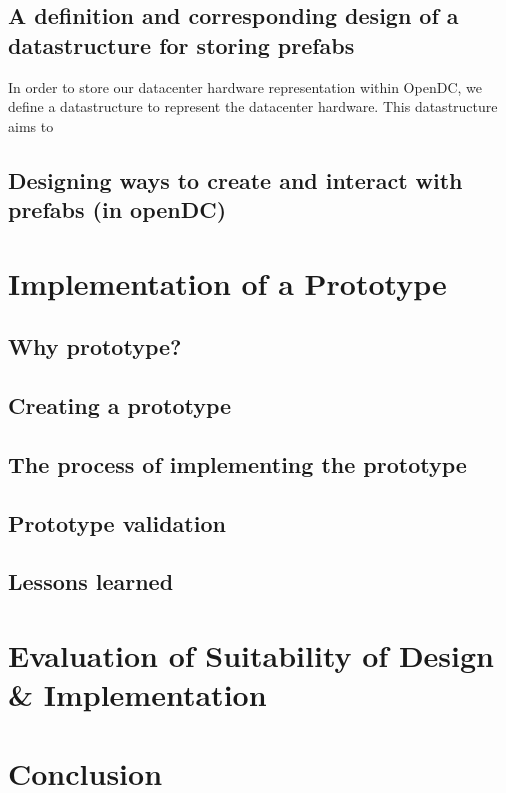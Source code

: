 \documentclass[11pt]{article}
\begin{document}
	\subsection{A definition and corresponding design of a datastructure for storing prefabs}
		In order to store our datacenter hardware representation within OpenDC, we define a datastructure to represent the datacenter hardware. 
		This datastructure aims to 
	\subsection{Designing ways to create and interact with prefabs (in openDC)}

\section{Implementation of a Prototype}

	\subsection{Why prototype?}

	\subsection{Creating a prototype}

	\subsection{The process of implementing the prototype}

	\subsection{Prototype validation}

	\subsection{Lessons learned}

\section{Evaluation of Suitability of Design \& Implementation}


\section{Conclusion} \label{sec:conclusion}



\end{document}
